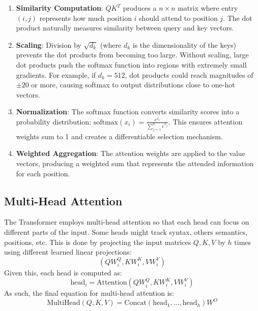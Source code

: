 \begin{enumerate}
   \item \textbf{Similarity Computation}: $QK^T$ produces a $n \times n$ matrix where entry $(i,j)$ represents how much position $i$ should attend to position $j$. The dot product naturally measures similarity between query and key vectors.

   \item \textbf{Scaling}: Division by $\sqrt{d_k}$ (where $d_k$ is the dimensionality of the keys) prevents the dot products from becoming too large. Without scaling, large dot products push the softmax function into regions with extremely small gradients. For example, if $d_k = 512$, dot products could reach magnitudes of $\pm 20$ or more, causing softmax to output distributions close to one-hot vectors.

   \item \textbf{Normalization}: The softmax function converts similarity scores into a probability distribution: $\text{softmax}(x_i) = \frac{e^{x_i}}{\sum_{j=1}^n e^{x_j}}$. This ensures attention weights sum to 1 and creates a differentiable selection mechanism.

   \item \textbf{Weighted Aggregation}: The attention weights are applied to the value vectors, producing a weighted sum that represents the attended information for each position.
\end{enumerate}

\subsection{Multi-Head Attention}

The Transformer employs multi-head attention so that each head can focus on different parts of the input. Some heads might track syntax, others semantics, positions, etc. This is done by projecting the input matrices $Q, K, V$ by $h$ times using different learned linear projections:
\begin{equation}
(QW_i^Q, KW_i^K, VW_i^V)
\end{equation}
Given this, each head is computed as:
\begin{equation}
\text{head}_i = \text{Attention}(QW_i^Q, KW_i^K, VW_i^V)
\end{equation}
As such, the final equation for multi-head attention is:
\begin{equation}
\text{MultiHead}(Q, K, V) = \text{Concat}(\text{head}_1, \ldots, \text{head}_h)W^O
\end{equation}

